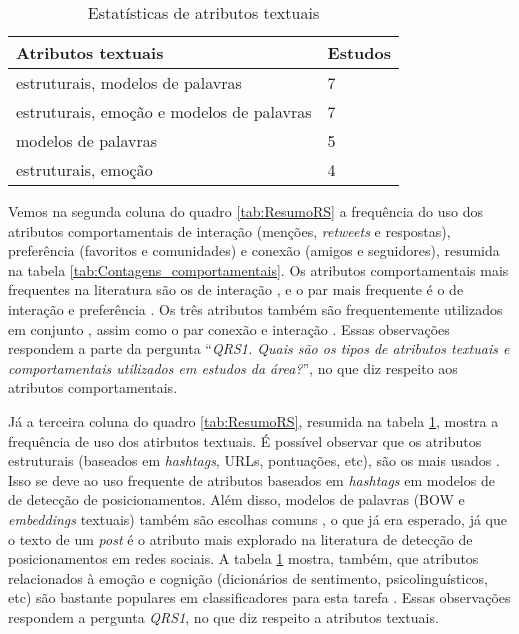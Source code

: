 \documentclass[
	12pt, oneside, a4paper, english, brazil
]{abntex2ppgsi}
\begin{document}
\begin{table}
    \caption{Estatísticas de atributos textuais}
    \centering
    \begin{tabular}{ l  l }
        \hline
        Atributos textuais & Estudos \\
        \hline
        estruturais, modelos de palavras & 7 \\
        estruturais, emoção e modelos de palavras & 7 \\
        modelos de palavras & 5 \\
        estruturais, emoção & 4 \\
        \hline
    \end{tabular}
    \label{tab:Contagens_textuais}
\end{table}

Vemos na segunda coluna do quadro \ref{tab:ResumoRS} a frequência do uso dos atributos comportamentais de interação (menções, {\em retweets} e respostas), preferência (favoritos e comunidades) e conexão (amigos e seguidores), resumida na tabela \ref{tab:Contagens_comportamentais}. Os atributos comportamentais mais frequentes na literatura são os de interação \cite{m.2021, das2020}, e o par mais frequente é o de interação e preferência \cite{stefan2022, sunderraman2022}. Os três atributos também são frequentemente utilizados em conjunto \cite{kiat2022}, assim como o par conexão e interação \cite{walid2022}. Essas observações respondem a parte da pergunta ``{\em QRS1. Quais são os tipos de atributos textuais e comportamentais utilizados em estudos da área?}'', no que diz respeito aos atributos comportamentais.

Já a terceira coluna do quadro \ref{tab:ResumoRS}, resumida na tabela \ref{tab:Contagens_textuais}, mostra a frequência de uso dos atirbutos textuais. É possível observar que os atributos estruturais (baseados em {\em hashtags}, URLs, pontuações, etc), são os mais usados \cite{aono2020, paolo2019}. Isso se deve ao uso frequente de atributos baseados em {\em hashtags} em modelos de de detecção de posicionamentos. Além disso, modelos de palavras (BOW e {\em embeddings} textuais) também são escolhas comuns \cite{stefan2022, das2020}, o que já era esperado, já que o texto de um {\em post} é o atributo mais explorado na literatura de detecção de posicionamentos em redes sociais. A tabela \ref{tab:Contagens_textuais} mostra, também, que atributos relacionados à emoção e cognição (dicionários de sentimento, psicolinguísticos, etc) são bastante populares em classificadores para esta tarefa \cite{m.2021, b.2018}. Essas observações respondem a pergunta {\em QRS1}, no que diz respeito a atributos textuais.
\end{document}
